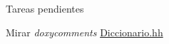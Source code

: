 \begin{DoxyRefDesc}{Tareas pendientes}
\item[\mbox{\hyperlink{todo__todo000001}{Tareas pendientes}}]Mirar {\itshape doxycomments} \mbox{\hyperlink{_diccionario_8hh}{Diccionario.\+hh}}\end{DoxyRefDesc}
